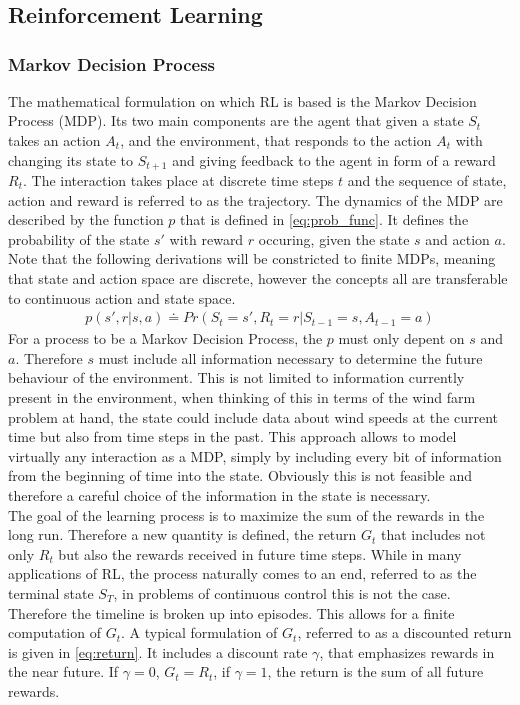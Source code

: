 \chapter{}
\section{Reinforcement Learning}
\subsection{Markov Decision Process}
The mathematical formulation on which RL is based is the Markov Decision Process (MDP). Its two main components are the agent that given a state $S_t$ takes an action $A_t$, and the environment, that responds to the action $A_t$ with changing its state to $S_{t+1}$ and giving feedback to the agent in form of a reward $R_t$. The interaction takes place at discrete time steps $t$ and the sequence of state, action and reward is referred to as the trajectory. The dynamics of the MDP are described by the function $p$ that is defined in \eqref{eq:prob_func}. It defines the probability of the state $s'$ with reward $r$ occuring, given the state $s$ and action $a$. Note that the following derivations will be constricted to finite MDPs, meaning that state and action space are discrete, however the concepts all are transferable to continuous action and state space.
\begin{align}
	p(s',r \vert s,a) \doteq Pr(S_t=s', R_t=r \vert S_{t-1} = s, A_{t-1} = a) \label{eq:prob_func}
\end{align}
For a process to be a Markov Decision Process, the $p$ must only depent on $s$ and $a$. Therefore $s$ must include all information necessary to determine the future behaviour of the environment. This is not limited to information currently present in the environment, when thinking of this in terms of the wind farm problem at hand, the state could include data about wind speeds at the current time but also from time steps in the past. This approach allows to model virtually any interaction as a MDP, simply by including every bit of information from the beginning of time into the state. Obviously this is not feasible and therefore a careful choice of the information in the state is necessary. \\
The goal of the learning process is to maximize the sum of the rewards in the long run. Therefore a new quantity is defined, the return $G_t$ that includes not only $R_t$ but also the rewards received in future time steps. While in many applications of RL, the process naturally comes to an end, referred to as the terminal state $S_T$, in problems of continuous control this is not the case. Therefore the timeline is broken up into episodes. This allows for a finite computation of $G_t$. A typical formulation of $G_t$, referred to as a discounted return is given in \eqref{eq:return}. It includes a discount rate $\gamma$, that emphasizes rewards in the near future. If $\gamma = 0$, $G_t = R_t$, if $\gamma = 1$, the return is the sum of all future rewards. \cite[p. 47- 57]{sutton_reinforcement_2018}
